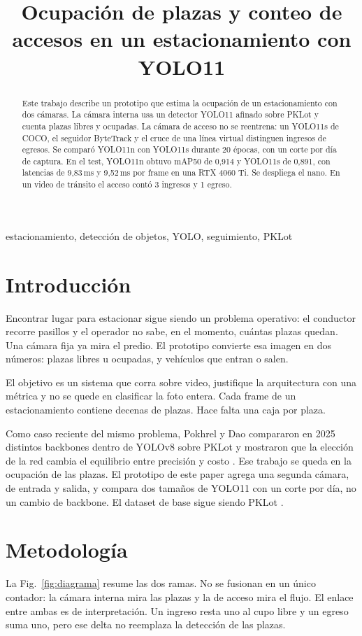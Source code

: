 \documentclass[conference,a4paper]{IEEEtran}
\title{Ocupación de plazas y conteo de accesos en un estacionamiento con YOLO11}
\author{%
\IEEEauthorblockN{Trabajo práctico}
\IEEEauthorblockA{Visión por Computadora II\\
CEIA, Facultad de Ingeniería, Universidad de Buenos Aires}
}
\begin{document}
\maketitle

\begin{abstract}
Este trabajo describe un prototipo que estima la ocupación de un estacionamiento con dos cámaras. La cámara interna usa un detector YOLO11 afinado sobre PKLot y cuenta plazas libres y ocupadas. La cámara de acceso no se reentrena: un YOLO11s de COCO, el seguidor ByteTrack y el cruce de una línea virtual distinguen ingresos de egresos. Se comparó YOLO11n con YOLO11s durante 20 épocas, con un corte por día de captura. En el test, YOLO11n obtuvo mAP50 de 0,914 y YOLO11s de 0,891, con latencias de 9,83\,ms y 9,52\,ms por frame en una RTX 4060 Ti. Se despliega el nano. En un video de tránsito el acceso contó 3 ingresos y 1 egreso.
\end{abstract}

\begin{IEEEkeywords}
estacionamiento, detección de objetos, YOLO, seguimiento, PKLot
\end{IEEEkeywords}

\section{Introducción}
Encontrar lugar para estacionar sigue siendo un problema operativo: el conductor recorre pasillos y el operador no sabe, en el momento, cuántas plazas quedan. Una cámara fija ya mira el predio. El prototipo convierte esa imagen en dos números: plazas libres u ocupadas, y vehículos que entran o salen.

El objetivo es un sistema que corra sobre video, justifique la arquitectura con una métrica y no se quede en clasificar la foto entera. Cada frame de un estacionamiento contiene decenas de plazas. Hace falta una caja por plaza.

Como caso reciente del mismo problema, Pokhrel y Dao compararon en 2025 distintos backbones dentro de YOLOv8 sobre PKLot y mostraron que la elección de la red cambia el equilibrio entre precisión y costo \cite{pokhrel2025yolov8pklot}. Ese trabajo se queda en la ocupación de las plazas. El prototipo de este paper agrega una segunda cámara, de entrada y salida, y compara dos tamaños de YOLO11 \cite{jocher2024yolo11} con un corte por día, no un cambio de backbone. El dataset de base sigue siendo PKLot \cite{almeida2015pklot}.

\section{Metodología}
La Fig.~\ref{fig:diagrama} resume las dos ramas. No se fusionan en un único contador: la cámara interna mira las plazas y la de acceso mira el flujo. El enlace entre ambas es de interpretación. Un ingreso resta uno al cupo libre y un egreso suma uno, pero ese delta no reemplaza la detección de las plazas.
\end{document}
